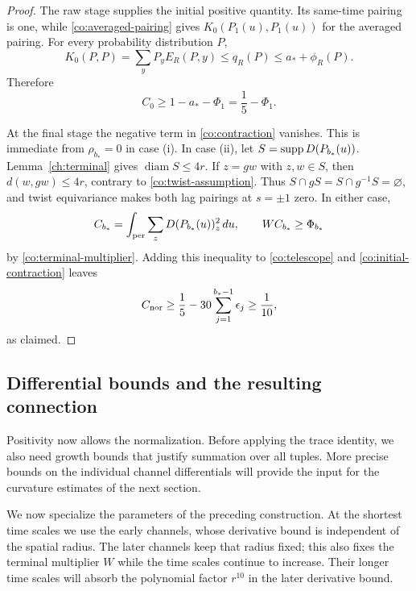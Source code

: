 \begin{proof}
The raw stage supplies the initial positive quantity.  Its same-time
pairing is one, while \eqref{co:averaged-pairing} gives
$K_0(P_1(u),P_1(u))$ for the averaged pairing.  For every probability
distribution $P$,
\[
 K_0(P,P)=\sum_yP_yE_R(P,y)\leq q_R(P)
 \leq a_*+\phi_R(P).
\]
Therefore
\begin{equation}
 C_0\geq1-a_*-\Phi_1=\frac15-\Phi_1.
 \label{co:initial-contraction}
\end{equation}

At the final stage the negative term in \eqref{co:contraction} vanishes.
This is immediate from $\rho_{b_*}=0$ in case (i).  In case (ii), let
$S=\operatorname{supp} D(P_{b_*}(u))$.  Lemma~\ref{ch:terminal} gives
$\operatorname{diam}S\leq4r$.  If $z=gw$ with $z,w\in S$, then
$d(w,gw)\leq4r$, contrary to \eqref{co:twist-assumption}.  Thus
$S\cap gS=S\cap g^{-1}S=\varnothing$, and twist equivariance makes both
lag pairings at $s=\pm1$ zero.  In either case,
\[
 C_{b_*}=\int_{\rm per}\sum_zD(P_{b_*}(u))_z^2\,du,
 \qquad WC_{b_*}\geq\Phi_{b_*}
\]
by \eqref{co:terminal-multiplier}.  Adding this inequality to
\eqref{co:telescope} and \eqref{co:initial-contraction} leaves
\[
 C_{\rm nor}\geq\frac15-30\sum_{j=1}^{b_*-1}\epsilon_j
 \geq\frac1{10},
\]
as claimed.
\end{proof}

\subsection{Differential bounds and the resulting connection}

Positivity now allows the normalization.  Before applying the trace
identity, we also need growth bounds that justify summation over all
tuples.  More precise bounds on the individual channel differentials
will provide the input for the curvature estimates of the next section.

We now specialize the parameters of the preceding construction.  At the
shortest time scales we use the early channels, whose derivative bound
is independent of the spatial radius.  The later channels keep that
radius fixed; this also fixes the terminal multiplier $W$ while the
time scales continue to increase.  Their longer time scales will absorb
the polynomial factor $r^{10}$ in the later derivative bound.

